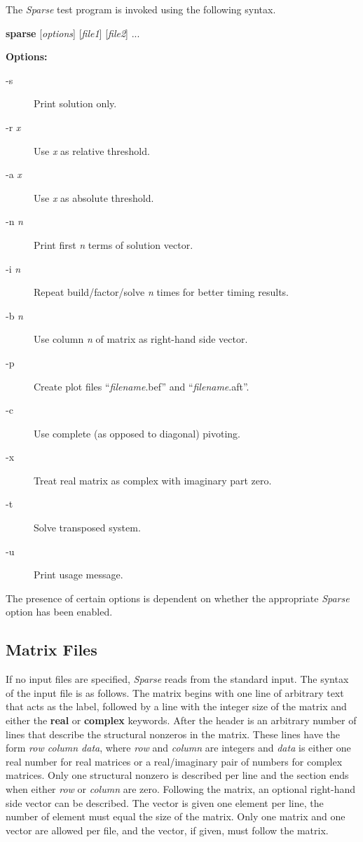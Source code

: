 \documentclass[11pt]{article}
\begin{document}
The \emph{Sparse} test program is invoked using the following syntax.

{\bf sparse} [\emph{options}] [\emph{file1}] [\emph{file2}] ...

{\bf Options:}
\begin{description}
\item[-s]
    Print solution only.
\item[-r\emph{ x}]
    Use \emph{x} as relative threshold.
\item[-a\emph{ x}]
    Use \emph{x} as absolute threshold.
\item[-n\emph{ n}]
    Print first \emph{n} terms of solution vector.
\item[-i\emph{ n}]
    Repeat build/factor/solve \emph{n} times for better timing results.
\item[-b\emph{ n}]
    Use column \emph{n} of matrix as right-hand side vector.
\item[-p]
    Create plot files ``\emph{filename}.bef'' and ``\emph{filename}.aft''.
\item[-c]
    Use complete (as opposed to diagonal) pivoting.
\item[-x]
    Treat real matrix as complex with imaginary part zero.
\item[-t]
    Solve transposed system.
\item[-u]
    Print usage message.
\end{description}

The presence of certain options is dependent on whether the appropriate
\emph{Sparse} option has been enabled.

\subsection{Matrix Files}
If no input files are specified, \emph{Sparse} reads from the standard
input.  The syntax of the input file is as follows.  The matrix begins
with one line of arbitrary text that acts as the label, followed by a
line with the integer size of the matrix and either the {\bf real} or
{\bf complex} keywords.  After the header is an arbitrary number of
lines that describe the structural nonzeros in the matrix.  These lines
have the form \emph{row column data}, where \emph{row} and \emph{column}
are integers and \emph{data} is either one real number for real matrices
or a real/imaginary pair of numbers for complex matrices.  Only one
structural nonzero is described per line and the section ends when
either \emph{row} or \emph{column} are zero.  Following the matrix, an
optional right-hand side vector can be described.  The vector is given
one element per line, the number of element must equal the size of the
matrix.  Only one matrix and one vector are allowed per file, and the
vector, if given, must follow the matrix.
\end{document}
